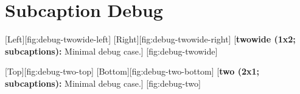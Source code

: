\documentclass[12pt,letterpaper]{article}
\begin{document}
\section*{Subcaption Debug}

\figfloat
    {
        \figtwowide
        {
            {[Left][fig:debug-twowide-left]}
            {[Right][fig:debug-twowide-right]}
        }
    }
    [\textbf{twowide (1x2; subcaptions):} Minimal debug case.]
    [fig:debug-twowide]

\figfloat
    {
        \figtwo
        {[Top][fig:debug-two-top]}
        {[Bottom][fig:debug-two-bottom]}
    }
    [\textbf{two (2x1; subcaptions):} Minimal debug case.]
    [fig:debug-two]
\end{document}
